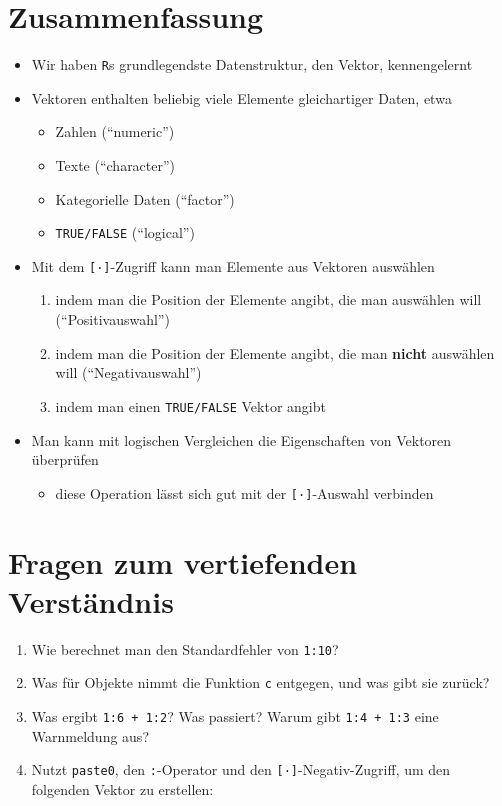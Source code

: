 \documentclass[12pt,]{tufte-book}
\providecommand{\tightlist}{%
  \setlength{\itemsep}{0pt}\setlength{\parskip}{0pt}}
\theoremstyle{definition}
\theoremstyle{definition}
\theoremstyle{definition}
\theoremstyle{remark}
\begin{document}
\section{Zusammenfassung}\label{zusammenfassung}

\begin{itemize}
\tightlist
\item
  Wir haben \texttt{R}s grundlegendste Datenstruktur, den Vektor,
  kennengelernt
\item
  Vektoren enthalten beliebig viele Elemente gleichartiger Daten, etwa

  \begin{itemize}
  \tightlist
  \item
    Zahlen (``numeric'')
  \item
    Texte (``character'')
  \item
    Kategorielle Daten (``factor'')
  \item
    \texttt{TRUE/FALSE} (``logical'')
  \end{itemize}
\item
  Mit dem \texttt{{[}·{]}}-Zugriff kann man Elemente aus Vektoren
  auswählen

  \begin{enumerate}
  \def\labelenumi{\alph{enumi}.}
  \tightlist
  \item
    indem man die Position der Elemente angibt, die man auswählen will
    (``Positivauswahl'')
  \item
    indem man die Position der Elemente angibt, die man \textbf{nicht}
    auswählen will (``Negativauswahl'')
  \item
    indem man einen \texttt{TRUE/FALSE} Vektor angibt
  \end{enumerate}
\item
  Man kann mit logischen Vergleichen die Eigenschaften von Vektoren
  überprüfen

  \begin{itemize}
  \tightlist
  \item
    diese Operation lässt sich gut mit der \texttt{{[}·{]}}-Auswahl
    verbinden
  \end{itemize}
\end{itemize}

\section{Fragen zum vertiefenden
Verständnis}\label{fragen-zum-vertiefenden-verstuxe4ndnis}

\begin{enumerate}
\def\labelenumi{\arabic{enumi}.}
\tightlist
\item
  Wie berechnet man den Standardfehler von \texttt{1:10}?
\item
  Was für Objekte nimmt die Funktion \texttt{c} entgegen, und was gibt
  sie zurück?
\item
  Was ergibt \texttt{1:6\ +\ 1:2}? Was passiert? Warum gibt
  \texttt{1:4\ +\ 1:3} eine Warnmeldung aus?
\item
  Nutzt \texttt{paste0}, den \texttt{:}-Operator und den
  \texttt{{[}·{]}}-Negativ-Zugriff, um den folgenden Vektor zu
  erstellen:
\end{enumerate}
\end{document}
